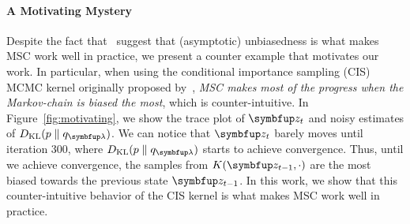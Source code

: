 \paragraph{A Motivating Mystery}
Despite the fact that~\citeauthor{NEURIPS2020_b2070693} suggest that (asymptotic) unbiasedness is what makes MSC work well in practice, we present a counter example that motivates our work.
In particular, when using the conditional importance sampling (CIS) MCMC kernel originally proposed by~\citeauthor{NEURIPS2020_b2070693}, \textit{MSC makes most of the progress when the Markov-chain is biased the most}, which is counter-intuitive.
In Figure~\ref{fig:motivating}, we show the trace plot of \(\vz_t\) and noisy estimates of \(\DKL{p}{q_{\vlambda}}\).
We can notice that \(\vz_t\) barely moves until iteration 300, where \(\DKL{p}{q_{\vlambda}}\) starts to achieve convergence.
Thus, until we achieve convergence, the samples from \(K(\vz_{t-1}, \cdot)\) are the most biased towards the previous state \(\vz_{t-1}\).
In this work, we show that this counter-intuitive behavior of the CIS kernel is what makes MSC work well in practice.

%

